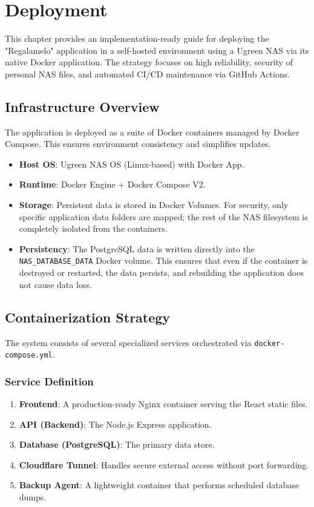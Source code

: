 \chapter{Deployment}
This chapter provides an implementation-ready guide for deploying the "Regalamelo" application in a self-hosted environment using a Ugreen NAS via its native Docker application. The strategy focuses on high reliability, security of personal NAS files, and automated CI/CD maintenance via GitHub Actions.

\section{Infrastructure Overview}
The application is deployed as a suite of Docker containers managed by Docker Compose. This ensures environment consistency and simplifies updates.

\begin{itemize}
    \item \textbf{Host OS}: Ugreen NAS OS (Linux-based) with Docker App.
    \item \textbf{Runtime}: Docker Engine + Docker Compose V2.
    \item \textbf{Storage}: Persistent data is stored in Docker Volumes. For security, only specific application data folders are mapped; the rest of the NAS filesystem is completely isolated from the containers.
    \item \textbf{Persistency}: The PostgreSQL data is written directly into the \texttt{NAS\_DATABASE\_DATA} Docker volume. This ensures that even if the container is destroyed or restarted, the data persists, and rebuilding the application does not cause data loss.
\end{itemize}

\section{Containerization Strategy}
The system consists of several specialized services orchestrated via \texttt{docker-compose.yml}.

\subsection{Service Definition}
\begin{enumerate}
    \item \textbf{Frontend}: A production-ready Nginx container serving the React static files.
    \item \textbf{API (Backend)}: The Node.js Express application.
    \item \textbf{Database (PostgreSQL)}: The primary data store.
    \item \textbf{Cloudflare Tunnel}: Handles secure external access without port forwarding.
    \item \textbf{Backup Agent}: A lightweight container that performs scheduled database dumps.
\end{enumerate}

